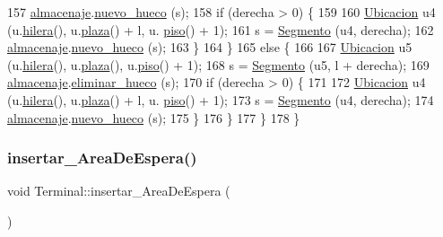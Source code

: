 \begin{DoxyCode}
157             \hyperlink{class_terminal_a1d87d7b16c4f460eee6f1ab73da90fd2}{almacenaje}.\hyperlink{class_almacenaje_ac98f7d262897f33ece29a432e111f02c}{nuevo\_hueco} (s);
158             \textcolor{keywordflow}{if} (derecha > 0) \{
159             
160                 \hyperlink{class_ubicacion}{Ubicacion} u4 (u.\hyperlink{class_ubicacion_abf00d08075e75ac833de7357ebc6f521}{hilera}(), u.\hyperlink{class_ubicacion_abed323ffb2eace375e80bc395fdaeb39}{plaza}() + l, u.
      \hyperlink{class_ubicacion_af6099f8de4dee993e4c9119e1f879070}{piso}() + 1);
161                 s = \hyperlink{class_segmento}{Segmento} (u4, derecha);
162                 \hyperlink{class_terminal_a1d87d7b16c4f460eee6f1ab73da90fd2}{almacenaje}.\hyperlink{class_almacenaje_ac98f7d262897f33ece29a432e111f02c}{nuevo\_hueco} (s);
163             \}
164         \}
165         \textcolor{keywordflow}{else} \{
166         
167             \hyperlink{class_ubicacion}{Ubicacion} u5 (u.\hyperlink{class_ubicacion_abf00d08075e75ac833de7357ebc6f521}{hilera}(), u.\hyperlink{class_ubicacion_abed323ffb2eace375e80bc395fdaeb39}{plaza}(), u.\hyperlink{class_ubicacion_af6099f8de4dee993e4c9119e1f879070}{piso}() + 1);
168             s = \hyperlink{class_segmento}{Segmento} (u5, l + derecha);
169             \hyperlink{class_terminal_a1d87d7b16c4f460eee6f1ab73da90fd2}{almacenaje}.\hyperlink{class_almacenaje_a20219014a2d5bf325df7245cd0822277}{eliminar\_hueco} (s);
170             \textcolor{keywordflow}{if} (derecha > 0) \{
171             
172                 \hyperlink{class_ubicacion}{Ubicacion} u4 (u.\hyperlink{class_ubicacion_abf00d08075e75ac833de7357ebc6f521}{hilera}(), u.\hyperlink{class_ubicacion_abed323ffb2eace375e80bc395fdaeb39}{plaza}() + l, u.
      \hyperlink{class_ubicacion_af6099f8de4dee993e4c9119e1f879070}{piso}() + 1);
173                 s = \hyperlink{class_segmento}{Segmento} (u4, derecha);
174                 \hyperlink{class_terminal_a1d87d7b16c4f460eee6f1ab73da90fd2}{almacenaje}.\hyperlink{class_almacenaje_ac98f7d262897f33ece29a432e111f02c}{nuevo\_hueco} (s);
175             \}
176         \}
177     \}
178 \}
\end{DoxyCode}
\mbox{\label{class_terminal_a672932def16149bd23a95d60956e42a0}} 
\subsubsection{\texorpdfstring{insertar\+\_\+\+Area\+De\+Espera()}{insertar\_AreaDeEspera()}}
{\footnotesize\ttfamily void Terminal\+::insertar\+\_\+\+Area\+De\+Espera (\begin{DoxyParamCaption}{ }\end{DoxyParamCaption})\hspace{0.3cm}{\ttfamily [private]}}



